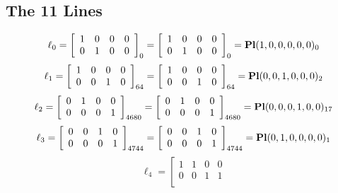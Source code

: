 \documentclass{article}
\begin{document}
{\subsection*{The 11 Lines}
$$
\ell_{0} = 
\left[
\begin{array}{*{4}{r}}
1 & 0 & 0 & 0\\
0 & 1 & 0 & 0\\
\end{array}
\right]
_{0}
=
\left[
\begin{array}{*{4}c}
1  & 0  & 0  & 0\\
0  & 1  & 0  & 0\\
\end{array}
\right]_{0}
={\rm\bf Pl}(1,0,0,0,0,0 )_{0}$$
$$
\ell_{1} = 
\left[
\begin{array}{*{4}{r}}
1 & 0 & 0 & 0\\
0 & 0 & 1 & 0\\
\end{array}
\right]
_{64}
=
\left[
\begin{array}{*{4}c}
1  & 0  & 0  & 0\\
0  & 0  & 1  & 0\\
\end{array}
\right]_{64}
={\rm\bf Pl}(0,0,1,0,0,0 )_{2}$$
$$
\ell_{2} = 
\left[
\begin{array}{*{4}{r}}
0 & 1 & 0 & 0\\
0 & 0 & 0 & 1\\
\end{array}
\right]
_{4680}
=
\left[
\begin{array}{*{4}c}
0  & 1  & 0  & 0\\
0  & 0  & 0  & 1\\
\end{array}
\right]_{4680}
={\rm\bf Pl}(0,0,0,1,0,0 )_{17}$$
$$
\ell_{3} = 
\left[
\begin{array}{*{4}{r}}
0 & 0 & 1 & 0\\
0 & 0 & 0 & 1\\
\end{array}
\right]
_{4744}
=
\left[
\begin{array}{*{4}c}
0  & 0  & 1  & 0\\
0  & 0  & 0  & 1\\
\end{array}
\right]_{4744}
={\rm\bf Pl}(0,1,0,0,0,0 )_{1}$$
$$
\ell_{4} = 
\left[
\begin{array}{*{4}{r}}
1 & 1 & 0 & 0\\
0 & 0 & 1 & 1\\
\end{array}
$$}
\end{document}
